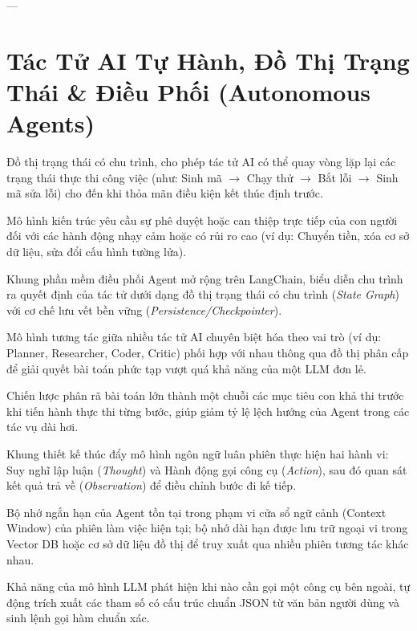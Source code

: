 ---

\section{Tác Tử AI Tự Hành, Đồ Thị Trạng Thái \& Điều Phối (Autonomous Agents)}
\label{sec:app-glossary-agents}

\begin{description}[leftmargin=2.5cm, style=nextline]
  \item[\term{Cyclic State Graph}] Đồ thị trạng thái có chu trình, cho phép tác tử AI có thể quay vòng lặp lại các trạng thái thực thi công việc (như: Sinh mã $\to$ Chạy thử $\to$ Bắt lỗi $\to$ Sinh mã sửa lỗi) cho đến khi thỏa mãn điều kiện kết thúc định trước.

  \item[\term{Human-in-the-Loop (HITL)}] Mô hình kiến trúc yêu cầu sự phê duyệt hoặc can thiệp trực tiếp của con người đối với các hành động nhạy cảm hoặc có rủi ro cao (ví dụ: Chuyển tiền, xóa cơ sở dữ liệu, sửa đổi cấu hình tường lửa).

  \item[\term{LangGraph}] Khung phần mềm điều phối Agent mở rộng trên LangChain, biểu diễn chu trình ra quyết định của tác tử dưới dạng đồ thị trạng thái có chu trình (\textit{State Graph}) với cơ chế lưu vết bền vững (\textit{Persistence/Checkpointer}).

  \item[\term{Multi-Agent Collaboration}] Mô hình tương tác giữa nhiều tác tử AI chuyên biệt hóa theo vai trò (ví dụ: Planner, Researcher, Coder, Critic) phối hợp với nhau thông qua đồ thị phân cấp để giải quyết bài toán phức tạp vượt quá khả năng của một LLM đơn lẻ.

  \item[\term{Plan-and-Solve}] Chiến lược phân rã bài toán lớn thành một chuỗi các mục tiêu con khả thi trước khi tiến hành thực thi từng bước, giúp giảm tỷ lệ lệch hướng của Agent trong các tác vụ dài hơi.

  \item[\term{ReAct (Reasoning and Acting)}] Khung thiết kế thúc đẩy mô hình ngôn ngữ luân phiên thực hiện hai hành vi: Suy nghĩ lập luận (\textit{Thought}) và Hành động gọi công cụ (\textit{Action}), sau đó quan sát kết quả trả về (\textit{Observation}) để điều chỉnh bước đi kế tiếp.

  \item[\term{Short-term vs Long-term Memory}] Bộ nhớ ngắn hạn của Agent tồn tại trong phạm vi cửa sổ ngữ cảnh (Context Window) của phiên làm việc hiện tại; bộ nhớ dài hạn được lưu trữ ngoại vi trong Vector DB hoặc cơ sở dữ liệu đồ thị để truy xuất qua nhiều phiên tương tác khác nhau.

  \item[\term{Tool Use (Function Calling)}] Khả năng của mô hình LLM phát hiện khi nào cần gọi một công cụ bên ngoài, tự động trích xuất các tham số có cấu trúc chuẩn JSON từ văn bản người dùng và sinh lệnh gọi hàm chuẩn xác.
\end{description}

